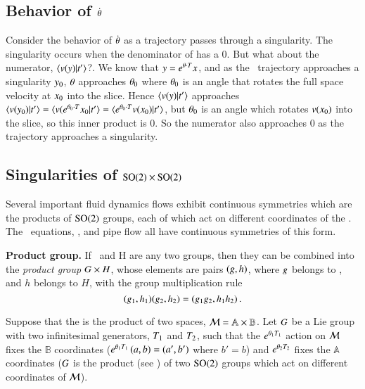 \subsection{Behavior of $\dot{{\bf \theta}}$}

Consider the behavior of $\dot{{\bf \theta}}$ as a trajectory passes through a singularity. The singularity occurs when the denominator of  has a 0. But what about the numerator, $\braket{\vel(\sspRed)}{\sliceTan{}}$?. We know that $y=e^{{\bf \theta}\cdot T}x$, and as the \reducedsp\ trajectory approaches a singularity $y_0$, ${\bf \theta}$ approaches ${\bf \theta}_0$ where ${\bf \theta}_0$ is an angle that rotates the full space velocity at $x_0$ into the slice. Hence $\braket{\vel(\sspRed)}{\sliceTan{}}$ approaches $\braket{\vel(\sspRed_0)}{\sliceTan{}}
=\braket{\vel(e^{\gSpace_0\cdot\Lg}\ssp_0}{\sliceTan{}}
=\braket{e^{\gSpace_0\cdot\Lg}\vel(\ssp_0)}{\sliceTan{}}$,
but ${\bf \theta}_0$ is an angle which rotates $v(x_0)$ into the slice, so this inner product is 0. So the numerator also approaches 0 as the trajectory approaches a singularity.

\subsection{Singularities of $\textrm{SO}(2) \times \textrm{SO}(2)$}

Several important fluid dynamics flows exhibit continuous symmetries which are the products of $\textrm{SO}(2)$ groups, each of which act on different coordinates of the {\statesp}. The \KS\ equations, {\pCf}, and pipe flow all have continuous symmetries of this form.

                                                     \toCB
\begin{definition}
\label{def:productGroup}
\textbf{Product group.}
If \Group\ and H are any two groups, then they can be combined into
the {\em product group} $G \times H$, whose
elements are pairs $(g,h)$, where $g$ belongs to \Group, and
$h$ belongs to $H$, with the group multiplication rule
\[
(g_1,h_1)(g_2,h_2)=(g_1 g_2,h_1 h_2)
\,.
\]
\end{definition}

Suppose that the {\statesp} is the product of two spaces,
${\cal M}=\mathbb{A} \times \mathbb{B}$. Let $G$ be a Lie group
with two infinitesimal generators, $T_1$ and $T_2$, such that the
$e^{{\bf \theta}_1 T_1}$ action on ${\cal M}$ fixes the $\mathbb{B}$
coordinates ($e^{{\bf \theta}_1 T_1} \, (a,b)=(a',b')$ where $b'=b$) and
$e^{{\bf \theta}_2 T_2}$ fixes the $\mathbb{A}$ coordinates ($G$ is the
product (see ) of two $\textrm{SO}(2)$ groups which act on
different coordinates of ${\cal M}$).

